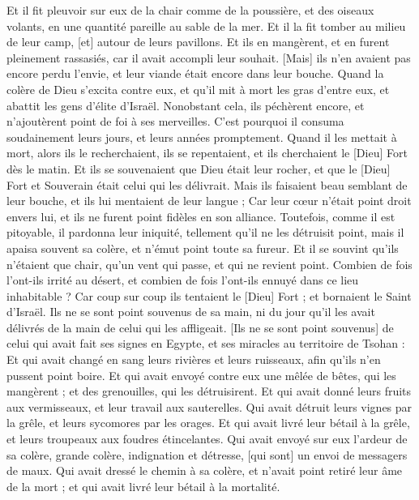 \begin{multicols}{2}
Et il fit pleuvoir sur eux de la chair comme de la poussière, et des oiseaux volants, en une quantité pareille au sable de la mer.
Et il la fit tomber au milieu de leur camp, [et] autour de leurs pavillons.
Et ils en mangèrent, et en furent pleinement rassasiés, car il avait accompli leur souhait.
[Mais] ils n'en avaient pas encore perdu l'envie, et leur viande était encore dans leur bouche.
Quand la colère de Dieu s'excita contre eux, et qu'il mit à mort les gras d'entre eux, et abattit les gens d'élite d'Israël.
Nonobstant cela, ils péchèrent encore, et n'ajoutèrent point de foi à ses merveilles.
C'est pourquoi il consuma soudainement leurs jours, et leurs années promptement.
Quand il les mettait à mort, alors ils le recherchaient, ils se repentaient, et ils cherchaient le [Dieu] Fort dès le matin.
Et ils se souvenaient que Dieu était leur rocher, et que le [Dieu] Fort et Souverain était celui qui les délivrait.
Mais ils faisaient beau semblant de leur bouche, et ils lui mentaient de leur langue ;
Car leur cœur n'était point droit envers lui, et ils ne furent point fidèles en son alliance.
Toutefois, comme il est pitoyable, il pardonna leur iniquité, tellement qu'il ne les détruisit point, mais il apaisa souvent sa colère, et n'émut point toute sa fureur.
Et il se souvint qu'ils n'étaient que chair, qu'un vent qui passe, et qui ne revient point.
Combien de fois l'ont-ils irrité au désert, et combien de fois l'ont-ils ennuyé dans ce lieu inhabitable ?
Car coup sur coup ils tentaient le [Dieu] Fort ; et bornaient le Saint d'Israël.
Ils ne se sont point souvenus de sa main, ni du jour qu'il les avait délivrés de la main de celui qui les affligeait.
[Ils ne se sont point souvenus] de celui qui avait fait ses signes en Egypte, et ses miracles au territoire de Tsohan :
Et qui avait changé en sang leurs rivières et leurs ruisseaux, afin qu'ils n'en pussent point boire.
Et qui avait envoyé contre eux une mêlée de bêtes, qui les mangèrent ; et des grenouilles, qui les détruisirent.
Et qui avait donné leurs fruits aux vermisseaux, et leur travail aux sauterelles.
Qui avait détruit leurs vignes par la grêle, et leurs sycomores par les orages.
Et qui avait livré leur bétail à la grêle, et leurs troupeaux aux foudres étincelantes.
Qui avait envoyé sur eux l'ardeur de sa colère, grande colère, indignation et détresse, [qui sont] un envoi de messagers de maux.
Qui avait dressé le chemin à sa colère, et n'avait point retiré leur âme de la mort ; et qui avait livré leur bétail à la mortalité.

\end{multicols}
